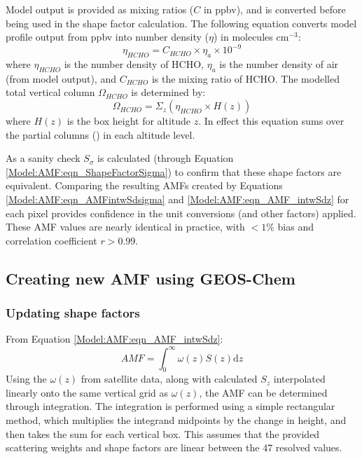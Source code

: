     Model output is provided as mixing ratios ($C$ in ppbv), and is converted before being used in the shape factor calculation.
    The following equation converts model profile output from ppbv into number density ($\eta$) in molecules cm$^{-3}$:
    \begin{equation} \label{Model:omiRecalc:eqn_ppb_to_n}
      \eta_{HCHO} = C_{HCHO} \times \eta_a \times 10^{-9}
    \end{equation}
    where $\eta_{HCHO}$ is the number density of HCHO, $\eta_a$ is the number density of air (from model output), and $C_{HCHO}$ is the mixing ratio of HCHO.
    The modelled total vertical column $\Omega_{HCHO}$ is determined by:
    \begin{equation*}
      \Omega_{HCHO} = \Sigma_z \left( \eta_{HCHO} \times H(z) \right)
    \end{equation*}
    where $H(z)$ is the box height for altitude $z$.
    In effect this equation sums over the partial columns (\moleccm) in each altitude level.
    
    As a sanity check $S_\sigma$ is calculated (through Equation \ref{Model:AMF:eqn_ShapeFactorSigma}) to confirm that these shape factors are equivalent.
    Comparing the resulting AMFs created by Equations \ref{Model:AMF:eqn_AMFintwSdsigma} and \ref{Model:AMF:eqn_AMF_intwSdz} for each pixel provides confidence in the unit conversions (and other factors) applied.
    These AMF values are nearly identical in practice, with $< 1\%$ bias and correlation coefficient $r > 0.99$.
    

  \subsection{Creating new AMF using GEOS-Chem}
    \label{Model:omiRecalc:AMF}
    
    \subsubsection{Updating shape factors}
    
      From Equation \ref{Model:AMF:eqn_AMF_intwSdz}:
      $$ AMF = \int_0^\infty \omega(z) S(z) \mathrm{d}z $$
      Using the $\omega(z)$ from satellite data, along with calculated $S_z$ interpolated linearly onto the same vertical grid as $\omega(z)$, the AMF can be determined through integration.
      The integration is performed using a simple rectangular method, which multiplies the integrand midpoints by the change in height, and then takes the sum for each vertical box.
      This assumes that the provided scattering weights and shape factors are linear between the 47 resolved values.
    
